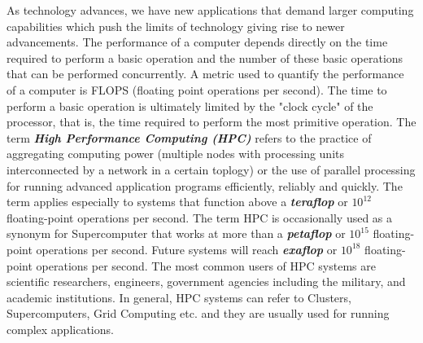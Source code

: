 As technology advances, we have new applications that demand larger computing capabilities which push the limits of technology giving rise to newer advancements. The performance of a computer depends directly on the time required to perform a basic operation and the number of these basic operations that can be performed concurrently. A metric used to quantify the performance of a computer is FLOPS (floating point operations per second). The time to perform a basic operation is ultimately limited by the "clock cycle" of the processor, that is, the time required to perform the most primitive operation. The term \textbf{\textit{High Performance Computing (HPC)}} refers to the practice of aggregating computing power (multiple nodes with processing units interconnected by a network in a certain toplogy) or the use of parallel processing for running advanced application programs efficiently, reliably and quickly. The term applies especially to systems that function above a \textbf{\textit{teraflop}} or \textbf{\textit{$10^{12}$}} floating-point operations per second. The term HPC is occasionally used as a synonym for Supercomputer that works at more than a \textbf{\textit{petaflop}} or \textbf{\textit{$10^{15}$}} floating-point operations per second. Future systems will reach \textbf{\textit{exaflop}} or \textbf{\textit{$10^{18}$}} floating-point operations per second. The most common users of HPC systems are scientific researchers, engineers, government agencies including the military, and academic institutions. In general, HPC systems can refer to Clusters, Supercomputers, Grid Computing etc. and they are usually used for running complex applications.\\ \par
\noindent
